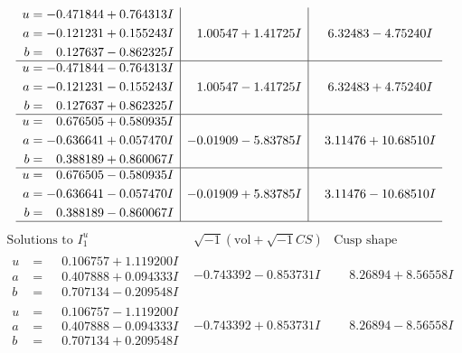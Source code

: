 \documentclass[1p]{elsarticle_modified}
\theoremstyle{definition}
\newcommand{\I}{\sqrt{-1}}
\begin{document}
$$\begin{array}{c|c|c}
\begin{aligned}
u &= -0.471844 + 0.764313 I \\
a &= -0.121231 + 0.155243 I \\
b &= \phantom{-}0.127637 - 0.862325 I\end{aligned}
 & \phantom{-}1.00547 + 1.41725 I & \phantom{-}6.32483 - 4.75240 I \\ \hline\begin{aligned}
u &= -0.471844 - 0.764313 I \\
a &= -0.121231 - 0.155243 I \\
b &= \phantom{-}0.127637 + 0.862325 I\end{aligned}
 & \phantom{-}1.00547 - 1.41725 I & \phantom{-}6.32483 + 4.75240 I \\ \hline\begin{aligned}
u &= \phantom{-}0.676505 + 0.580935 I \\
a &= -0.636641 + 0.057470 I \\
b &= \phantom{-}0.388189 + 0.860067 I\end{aligned}
 & -0.01909 - 5.83785 I & \phantom{-}3.11476 + 10.68510 I \\ \hline\begin{aligned}
u &= \phantom{-}0.676505 - 0.580935 I \\
a &= -0.636641 - 0.057470 I \\
b &= \phantom{-}0.388189 - 0.860067 I\end{aligned}
 & -0.01909 + 5.83785 I & \phantom{-}3.11476 - 10.68510 I\\
 \hline 
 \end{array}$$\newpage$$\begin{array}{c|c|c}  
\text{Solutions to }I^u_{1}& \I (\text{vol} + \sqrt{-1}CS) & \text{Cusp shape}\\
 \hline 
\begin{aligned}
u &= \phantom{-}0.106757 + 1.119200 I \\
a &= \phantom{-}0.407888 + 0.094333 I \\
b &= \phantom{-}0.707134 - 0.209548 I\end{aligned}
 & -0.743392 - 0.853731 I & \phantom{-}8.26894 + 8.56558 I \\ \hline\begin{aligned}
u &= \phantom{-}0.106757 - 1.119200 I \\
a &= \phantom{-}0.407888 - 0.094333 I \\
b &= \phantom{-}0.707134 + 0.209548 I\end{aligned}
 & -0.743392 + 0.853731 I & \phantom{-}8.26894 - 8.56558 I \\ \hline\begin{aligned}

\end{aligned}
\end{array}$$
\end{document}
